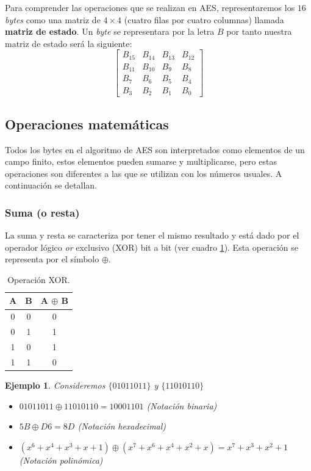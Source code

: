 \documentclass[peerreview]{IEEEtran}
\newtheorem{ejem}{\textbf{Ejemplo}}
\begin{document}
Para comprender las operaciones que se realizan en AES, representaremos los
$16$ \textit{bytes} como una matriz de $4\times 4$ (cuatro filas por cuatro
columnas) llamada \textbf{matriz de estado}. Un \textit{byte} se representara
por la letra $B$ por tanto nuestra matriz de estado será la siguiente:
\[ \begin{bmatrix}
    B_{15} & B_{14} & B_{13} & B_{12} \\
    B_{11} & B_{10} & B_9    & B_8    \\
    B_7    & B_6    & B_5    & B_4    \\
    B_3    & B_2    & B_1    & B_0
  \end{bmatrix}  \]
\subsection{Operaciones matemáticas}
Todos los bytes en el algoritmo de AES son interpretados como elementos de un
campo finito, estos elementos pueden sumarse y multiplicarse, pero estas
operaciones son diferentes a las que se utilizan con los números usuales. A continuación se detallan.\\
\subsubsection{Suma (o resta)}
La suma y resta se caracteriza por tener el mismo resultado y está dado por el
operador lógico \textit{or} exclusivo (XOR) bit a bit (ver cuadro \ref{tab:XOR}). Esta operación se
representa por el símbolo $\oplus$.

\begin{table}[h]
  \centering
  \begin{tabular}{|c|c|c|}
    \hline
    A & B & A $\oplus$ B \\ \hline
    0 & 0 & 0            \\ \hline
    0 & 1 & 1            \\ \hline
    1 & 0 & 1            \\ \hline
    1 & 1 & 0            \\ \hline
  \end{tabular}
  \caption{\label{tab:XOR}Operación XOR.}
\end{table}

\begin{ejem}
Consideremos $\{0101 1011\}$ y $\{1101 0110\}$
\begin{itemize}
	\item $01011011 \oplus 11010110=10001101$ (Notación binaria)
	
	\item $5B\oplus D6=8D$ (Notación hexadecimal)
	
	\item $(x^6 +x^4 +x^3 +x+1)\oplus (x^7 + x^6 + x^4 + x^2 +x)=x^7 + x^3 +
	x^2 +1$ (Notación polinómica)
\end{itemize}
\end{ejem}
\end{document}
